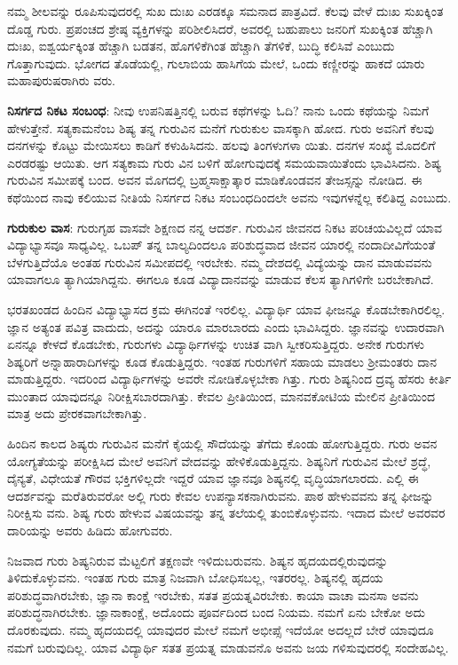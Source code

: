 ನಮ್ಮ ಶೀಲವನ್ನು ರೂಪಿಸುವುದರಲ್ಲಿ ಸುಖ ದುಃಖ ಎರಡಕ್ಕೂ ಸಮನಾದ ಪಾತ್ರವಿದೆ. ಕೆಲವು ವೇಳೆ ದುಃಖ ಸುಖಕ್ಕಿಂತ ದೊಡ್ಡ ಗುರು. ಪ್ರಪಂಚದ ಶ್ರೇಷ್ಠ ವ್ಯಕ್ತಿಗಳನ್ನು ಪರಿಶೀಲಿಸಿದರೆ, ಅವರಲ್ಲಿ ಬಹುಪಾಲು ಜನರಿಗೆ ಸುಖಕ್ಕಿಂತ ಹೆಚ್ಚಾಗಿ ದುಃಖ, ಐಶ್ವರ್ಯಕ್ಕಿಂತ ಹೆಚ್ಚಾಗಿ ಬಡತನ, ಹೊಗಳಿಕೆಗಿಂತ ಹೆಚ್ಚಾಗಿ ತೆಗಳಿಕೆ, ಬುದ್ಧಿ ಕಲಿಸಿವೆ ಎಂಬುದು ಗೊತ್ತಾಗುವುದು. ಭೋಗದ ತೊಡೆಯಲ್ಲಿ, ಗುಲಾಬಿಯ ಹಾಸಿಗೆಯ ಮೇಲೆ, ಒಂದು ಕಣ್ಣೀರನ್ನು ಹಾಕದೆ ಯಾರು ಮಹಾಪುರುಷರಾಗಿರು ವರು.

\textbf{ನಿಸರ್ಗದ ನಿಕಟ ಸಂಬಂಧ}: ನೀವು ಉಪನಿಷತ್ತಿನಲ್ಲಿ ಬರುವ ಕಥೆಗಳನ್ನು ಓದಿ? ನಾನು ಒಂದು ಕಥೆಯನ್ನು ನಿಮಗೆ ಹೇಳುತ್ತೇನೆ. ಸತ್ಯಕಾಮನೆಂಬ ಶಿಷ್ಯ ತನ್ನ ಗುರುವಿನ ಮನೆಗೆ ಗುರುಕುಲ ವಾಸಕ್ಕಾಗಿ ಹೋದ. ಗುರು ಅವನಿಗೆ ಕೆಲವು ದನಗಳನ್ನು ಕೊಟ್ಟು ಮೇಯಿಸಲು ಕಾಡಿಗೆ ಕಳುಹಿಸಿದನು. ಹಲವು ತಿಂಗಳುಗಳಾ ಯಿತು. ದನಗಳ ಸಂಖ್ಯೆ ಮೊದಲಿಗೆ ಎರಡರಷ್ಟು ಆಯಿತು. ಆಗ ಸತ್ಯಕಾಮ ಗುರು ವಿನ ಬಳಿಗೆ ಹೋಗುವುದಕ್ಕೆ ಸಮಯವಾಯಿತೆಂದು ಭಾವಿಸಿದನು. ಶಿಷ್ಯ ಗುರುವಿನ ಸಮೀಪಕ್ಕೆ ಬಂದ. ಅವನ ಮೊಗದಲ್ಲಿ ಬ್ರಹ್ಮಸಾಕ್ಷಾತ್ಕಾರ ಮಾಡಿಕೊಂಡವನ ತೇಜಸ್ಸನ್ನು ನೋಡಿದ. ಈ ಕಥೆಯಿಂದ ನಾವು ಕಲಿಯುವ ನೀತಿಯೆ ನಿಸರ್ಗದ ನಿಕಟ ಸಂಬಂಧದಿಂದಲೇ ಅವನು ಇವುಗಳನ್ನೆಲ್ಲ ಕಲಿತಿದ್ದ ಎಂಬುದು.

\textbf{ಗುರುಕುಲ ವಾಸ}: ಗುರುಗೃಹ ವಾಸವೇ ಶಿಕ್ಷಣದ ನನ್ನ ಆದರ್ಶ. ಗುರುವಿನ ಜೀವನದ ನಿಕಟ ಪರಿಚಯವಿಲ್ಲದೆ ಯಾವ ವಿದ್ಯಾಭ್ಯಾಸವೂ ಸಾಧ್ಯವಿಲ್ಲ. ಒಬಪ್ ತನ್ನ ಬಾಲ್ಯದಿಂದಲೂ ಪರಿಶುದ್ಧವಾದ ಜೀವನ ಯಾರಲ್ಲಿ ನಂದಾದೀವಿಗೆಯಂತೆ ಬೆಳಗುತ್ತಿದೆಯೊ ಅಂತಹ ಗುರುವಿನ ಸಮೀಪದಲ್ಲಿ ಇರಬೇಕು. ನಮ್ಮ ದೇಶದಲ್ಲಿ ವಿದ್ಯೆಯನ್ನು ದಾನ ಮಾಡುವವನು ಯಾವಾಗಲೂ ತ್ಯಾಗಿಯಾಗಿದ್ದನು. ಈಗಲೂ ಕೂಡ ವಿದ್ಯಾದಾನವನ್ನು ಮಾಡುವ ಕೆಲಸ ತ್ಯಾಗಿಗಳಿಗೇ ಬರಬೇಕಾಗಿದೆ.

ಭರತಖಂಡದ ಹಿಂದಿನ ವಿದ್ಯಾಭ್ಯಾಸದ ಕ್ರಮ ಈಗಿನಂತೆ ಇರಲಿಲ್ಲ. ವಿದ್ಯಾರ್ಥಿ ಯಾವ ಫೀಜನ್ನೂ ಕೊಡಬೇಕಾಗಿರಲಿಲ್ಲ. ಜ್ಞಾನ ಅತ್ಯಂತ ಪವಿತ್ರ ವಾದುದು, ಅದನ್ನು ಯಾರೂ ಮಾರಬಾರದು ಎಂದು ಭಾವಿಸಿದ್ದರು. ಜ್ಞಾನವನ್ನು ಉದಾರವಾಗಿ ಏನನ್ನೂ ಕೇಳದೆ ಕೊಡಬೇಕು, ಗುರುಗಳು ವಿದ್ಯಾರ್ಥಿಗಳನ್ನು ಉಚಿತ ವಾಗಿ ಸ್ವೀಕರಿಸುತ್ತಿದ್ದರು. ಅನೇಕ ಗುರುಗಳು ಶಿಷ್ಯರಿಗೆ ಅನ್ನಾಹಾರಾದಿಗಳನ್ನು ಕೂಡ ಕೊಡುತ್ತಿದ್ದರು. ಇಂತಹ ಗುರುಗಳಿಗೆ ಸಹಾಯ ಮಾಡಲು ಶ್ರೀಮಂತರು ದಾನ ಮಾಡುತ್ತಿದ್ದರು. ಇದರಿಂದ ವಿದ್ಯಾರ್ಥಿಗಳನ್ನು ಅವರೇ ನೋಡಿಕೊಳ್ಳಬೇಕಾ ಗಿತ್ತು. ಗುರು ಶಿಷ್ಯನಿಂದ ದ್ರವ್ಯ ಹೆಸರು ಕೀರ್ತಿ ಮುಂತಾದ ಯಾವುದನ್ನೂ ನಿರೀಕ್ಷಿಸಬಾರದಾಗಿತ್ತು. ಕೇವಲ ಪ್ರೀತಿಯಿಂದ, ಮಾನವಕೋಟಿಯ ಮೇಲಿನ ಪ್ರೀತಿಯಿಂದ ಮಾತ್ರ ಅದು ಪ್ರೇರಕವಾಗಬೇಕಾಗಿತ್ತು.

ಹಿಂದಿನ ಕಾಲದ ಶಿಷ್ಯರು ಗುರುವಿನ ಮನೆಗೆ ಕೈಯಲ್ಲಿ ಸೌದೆಯನ್ನು ತೆಗೆದು ಕೊಂಡು ಹೋಗುತ್ತಿದ್ದರು. ಗುರು ಅವನ ಯೋಗ್ಯತೆಯನ್ನು ಪರೀಕ್ಷಿಸಿದ ಮೇಲೆ ಅವನಿಗೆ ವೇದವನ್ನು ಹೇಳಿಕೊಡುತ್ತಿದ್ದನು. ಶಿಷ್ಯನಿಗೆ ಗುರುವಿನ ಮೇಲೆ ಶ್ರದ್ಧೆ, ದೈನ್ಯತೆ, ವಿಧೇಯತೆ ಗೌರವ ಭಕ್ತಿಗಳಿಲ್ಲದೇ ಇದ್ದರೆ ಯಾವ ಜ್ಞಾನವೂ ಶಿಷ್ಯನಲ್ಲಿ ವೃದ್ಧಿಯಾಗಲಾರದು. ಎಲ್ಲಿ ಈ ಆದರ್ಶವನ್ನು ಮರೆತಿರುವರೋ ಅಲ್ಲಿ ಗುರು ಕೇವಲ ಉಪನ್ಯಾಸಕನಾಗಿರುವನು. ಪಾಠ ಹೇಳುವವನು ತನ್ನ ಫೀಜನ್ನು ನಿರೀಕ್ಷಿಸು ವನು. ಶಿಷ್ಯ ಗುರು ಹೇಳುವ ವಿಷಯವನ್ನು ತನ್ನ ತಲೆಯಲ್ಲಿ ತುಂಬಿಕೊಳ್ಳುವನು. ಇದಾದ ಮೇಲೆ ಅವರವರ ದಾರಿಯನ್ನು ಅವರು ಹಿಡಿದು ಹೋಗುವರು.

ನಿಜವಾದ ಗುರು ಶಿಷ್ಯನಿರುವ ಮೆಟ್ಟಲಿಗೆ ತಕ್ಷಣವೇ ಇಳಿದುಬರುವನು. ಶಿಷ್ಯನ ಹೃದಯದಲ್ಲಿರುವುದನ್ನು ತಿಳಿದುಕೊಳ್ಳುವನು. ಇಂತಹ ಗುರು ಮಾತ್ರ ನಿಜವಾಗಿ ಬೋಧಿಸಬಲ್ಲ, ಇತರರಲ್ಲ. ಶಿಷ್ಯನಲ್ಲಿ ಹೃದಯ ಪರಿಶುದ್ಧವಾಗಿರಬೇಕು, ಜ್ಞಾನಾ ಕಾಂಕ್ಷೆ ಇರಬೇಕು, ಸತತ ಪ್ರಯತ್ನವಿರಬೇಕು. ಕಾಯಾ ವಾಚಾ ಮನಸಾ ಅವನು ಪರಿಶುದ್ಧನಾಗಿರಬೇಕು. ಜ್ಞಾನಾಕಾಂಕ್ಷೆ, ಅದೊಂದು ಪೂರ್ವದಿಂದ ಬಂದ ನಿಯಮ. ನಮಗೆ ಏನು ಬೇಕೋ ಅದು ದೊರಕುವುದು. ನಮ್ಮ ಹೃದಯದಲ್ಲಿ ಯಾವುದರ ಮೇಲೆ ನಮಗೆ ಅಭೀಪ್ಸೆ ಇದೆಯೋ ಅದಲ್ಲದೆ ಬೇರೆ ಯಾವುದೂ ನಮಗೆ ಬರುವುದಿಲ್ಲ. ಯಾವ ವಿದ್ಯಾರ್ಥಿ ಸತತ ಪ್ರಯತ್ನ ಮಾಡುವನೊ ಅವನು ಜಯ ಗಳಿಸುವುದರಲ್ಲಿ ಸಂದೇಹವಿಲ್ಲ.

